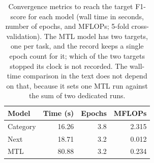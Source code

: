 \begin{table}[htbp]
\caption{Convergence metrics to reach the target F1-score for each model (wall time in seconds, number of epochs, and MFLOPs; 5-fold cross-validation). The MTL model has two targets, one per task, and the record keeps a single epoch count for it; which of the two targets stopped its clock is not recorded. The wall-time comparison in the text does not depend on that, because it sets one MTL run against the sum of two dedicated runs.}
\label{tab:cbic:convergence}
\centering
\begin{tabular}{lrrr}
\toprule
\textbf{Model}    & \textbf{Time (s)} & \textbf{Epochs} & \textbf{MFLOPs} \\
\midrule
Category & 16.26 & 3.8 & 2.315 \\
Next     & 18.71 & 3.2 & 0.012 \\
MTL      & 80.88 & 3.2 & 0.234 \\
\bottomrule
\end{tabular}
\end{table}
